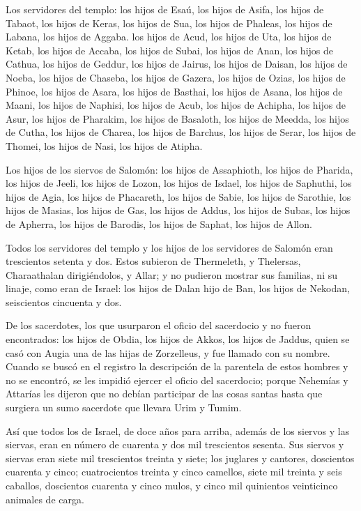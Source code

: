  Los servidores del templo: los hijos de Esaú, los hijos
de Asifa, los hijos de Tabaot, los hijos de Keras, los hijos de Sua, los
hijos de Phaleas, los hijos de Labana, los hijos de Aggaba.
 los hijos de Acud, los hijos de Uta, los hijos de Ketab,
los hijos de Accaba, los hijos de Subai, los hijos de Anan, los hijos de
Cathua, los hijos de Geddur,  los hijos de Jairus, los
hijos de Daisan, los hijos de Noeba, los hijos de Chaseba, los hijos de
Gazera, los hijos de Ozias, los hijos de Phinoe, los hijos de Asara, los
hijos de Basthai, los hijos de Asana, los hijos de Maani, los hijos de
Naphisi, los hijos de Acub, los hijos de Achipha, los hijos de Asur, los
hijos de Pharakim, los hijos de Basaloth,  los hijos de
Meedda, los hijos de Cutha, los hijos de Charea, los hijos de Barchus,
los hijos de Serar, los hijos de Thomei, los hijos de Nasi, los hijos de
Atipha.

 Los hijos de los siervos de Salomón: los hijos de
Assaphioth, los hijos de Pharida, los hijos de Jeeli, los hijos de
Lozon, los hijos de Isdael, los hijos de Saphuthi,  los
hijos de Agia, los hijos de Phacareth, los hijos de Sabie, los hijos de
Sarothie, los hijos de Masias, los hijos de Gas, los hijos de Addus, los
hijos de Subas, los hijos de Apherra, los hijos de Barodis, los hijos de
Saphat, los hijos de Allon.

 Todos los servidores del templo y los hijos de los
servidores de Salomón eran trescientos setenta y dos. 
Estos subieron de Thermeleth, y Thelersas, Charaathalan dirigiéndolos, y
Allar;  y no pudieron mostrar sus familias, ni su linaje,
como eran de Israel: los hijos de Dalan hijo de Ban, los hijos de
Nekodan, seiscientos cincuenta y dos.

 De los sacerdotes, los que usurparon el oficio del
sacerdocio y no fueron encontrados: los hijos de Obdia, los hijos de
Akkos, los hijos de Jaddus, quien se casó con Augia una de las hijas de
Zorzelleus, y fue llamado con su nombre.  Cuando se buscó
en el registro la descripción de la parentela de estos hombres y no se
encontró, se les impidió ejercer el oficio del sacerdocio;
 porque Nehemías y Attarías les dijeron que no debían
participar de las cosas santas hasta que surgiera un sumo sacerdote que
llevara Urim y Tumim.

 Así que todos los de Israel, de doce años para arriba,
además de los siervos y las siervas, eran en número de cuarenta y dos
mil trescientos sesenta.  Sus siervos y siervas eran
siete mil trescientos treinta y siete; los juglares y cantores,
doscientos cuarenta y cinco;  cuatrocientos treinta y
cinco camellos, siete mil treinta y seis caballos, doscientos cuarenta y
cinco mulos, y cinco mil quinientos veinticinco animales de carga.

